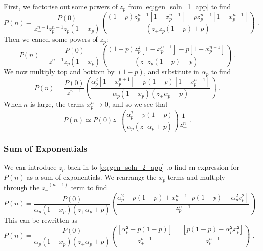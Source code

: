\documentclass[a4paper,10pt]{article}
\begin{document}
First, we factorise out some powers of $z_p$ from \eqref{eq:gen_soln_1_app} to find
\begin{equation}
  P(n) = \frac{P(0)}{z_+^{n-1} z_p^{n-1}z_p(1-x_p)} \left( \frac{ (1-p) z_p^{n+1}[1 - x_p^{n+1}] - p  z_p^{n-1}[ 1 - x_p^{n-1}]}{(z_+z_p(1-p) + p)} \right) \;. 
\end{equation}
Then we cancel some powers of $z_p$:
\begin{equation}
  P(n) = \frac{P(0)}{z_+^{n-1} z_p(1-x_p)} \left( \frac{ (1-p) z_p^{2}[1 - x_p^{n+1}] - p  [ 1 - x_p^{n-1}]}{(z_+z_p(1-p) + p)} \right) \;. 
\end{equation}
We now multiply top and bottom by $(1-p)$, and substitute in $\alpha_p$ to find
\begin{equation}\label{eq:gen_soln_2_app}
  P(n) = \frac{P(0)}{z_+^{n-1}} \left( \frac{ \alpha_p^{2}[1 - x_p^{n+1}] - p  (1-p) [ 1 - x_p^{n-1}]}{ \alpha_p(1-x_p)(z_+\alpha_p + p)} \right) \;. 
\end{equation}
When $n$ is large, the terms $x_p^n \to 0$, and so we see that
\begin{equation}
  P(n) \simeq P(0) z_+ \left( \frac{ \alpha_p^{2} - p  (1-p) }{ \alpha_p(z_+\alpha_p + p)} \right) \frac{1}{z_+^{n}} \;. 
\end{equation}


\subsubsection{Sum of Exponentials}

We can introduce $z_p$ back in to \eqref{eq:gen_soln_2_app} to find an expression for $P(n)$ as a sum of exponentials. We rearrange the $x_p$ terms and multiply through the $z_+^{-(n-1)}$ term to find
\begin{equation}
  P(n) = \frac{P(0)}{ \alpha_p(1-x_p)(z_+\alpha_p + p)} \left( \frac{ \alpha_p^{2}-p(1-p) + x_p^{n-1} [ p(1-p) - \alpha_p^2 x_p^2]}{z_p^{n-1}}  \right) \;. 
\end{equation}
This can be rewritten as
\begin{equation}\label{eq:gen_soln_3_app}
  P(n) = \frac{P(0)}{ \alpha_p(1-x_p)(z_+\alpha_p + p)} \left( \frac{[\alpha_p^{2}-p(1-p)]}{z_+^{n-1}} + \frac{[ p(1-p) - \alpha_p^2 x_p^2]}{z_p^{n-1}}  \right) \;. 
\end{equation}

\end{document}

